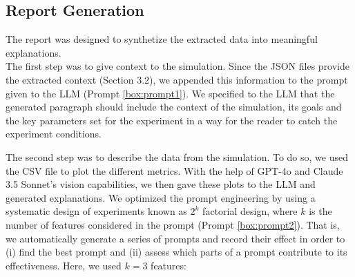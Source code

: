 \documentclass[preprint,12pt]{elsarticle}
\begin{document}
\subsection{Report Generation}
\label{subsec3}


The report was designed to synthetize the extracted data into meaningful explanations.\\

The first step was to give context to the simulation. Since the JSON files provide the extracted context  (Section 3.2), we appended this information to the prompt given to the LLM (Prompt \ref{box:prompt1}). We specified to the LLM that the generated paragraph should include the context of the simulation, its goals and the key parameters set for the experiment in a way for the reader to catch the experiment conditions.

The second step was to describe the data from the simulation. To do so, we used the CSV file to plot the different metrics. With the help of GPT-4o and Claude 3.5 Sonnet's vision capabilities, we then gave these plots to the LLM and generated  explanations. We optimized the prompt engineering by using a systematic design of experiments known as $2^k$ factorial design, where $k$ is the number of features considered in the prompt (Prompt \ref{box:prompt2}). That is, we automatically generate a series of prompts and record their effect in order to (i) find the best prompt and (ii) assess which parts of a prompt contribute to its effectiveness. Here, we used $k=3$ features:\\
\end{document}
